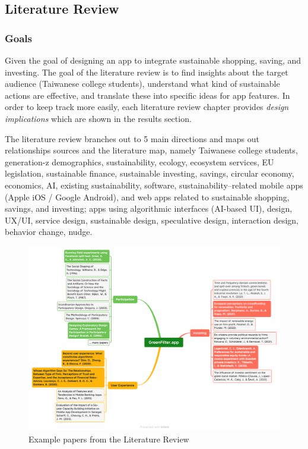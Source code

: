 \documentclass[
  12pt,
  letterpaper,
  DIV=11,
  numbers=noendperiod]{scrartcl}
\begin{document}
\newpage

\subsection{Literature Review}\label{literature-review}

\subsubsection{Goals}\label{goals}

Given the goal of designing an app to integrate sustainable shopping,
saving, and investing. The goal of the literature review is to find
insights about the target audience (Taiwanese college students),
understand what kind of sustainable actions are effective, and translate
these into specific ideas for app features. In order to keep track more
easily, each literature review chapter provides \emph{design
implications} which are shown in the results section.

The literature review branches out to 5 main directions and maps out
relationships sources and the literature map, namely Taiwanese college
students, generation-z demographics, sustainability, ecology, ecosystem
services, EU legislation, sustainable finance, sustainable investing,
savings, circular economy, economics, AI, existing sustainability,
software, sustainability--related mobile apps (Apple iOS / Google
Android), and web apps related to sustainable shopping, savings, and
investing; apps using algorithmic interfaces (AI-based UI), design,
UX/UI, service design, sustainable design, speculative design,
interaction design, behavior change, nudge.

\begin{figure}[H]

{\centering \includegraphics[width=1\linewidth,height=\textheight,keepaspectratio]{./images/literature/literature.png}

}

\caption{Example papers from the Literature Review}

\end{figure}%
\end{document}
